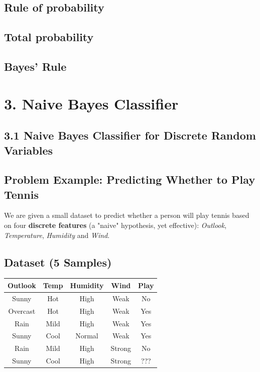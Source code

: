 \documentclass{article}
\begin{document}
\subsection*{Rule of probability}

\subsection*{Total probability}

\subsection*{Bayes' Rule}

\section*{3. Naive Bayes Classifier}

\subsection*{3.1 Naive Bayes Classifier for Discrete Random Variables}
\subsection*{Problem Example: Predicting Whether to Play Tennis}

We are given a small dataset to predict whether a person will play tennis based on four \textbf{discrete features} (a "naive" hypothesis, yet effective): \textit{Outlook}, \textit{Temperature}, \textit{Humidity} and \textit{Wind}.

\subsection*{Dataset (5 Samples)}

\begin{center}
\begin{tabular}{|c|c|c|c|c|}
\hline
Outlook & Temp & Humidity & Wind & Play \\
\hline
Sunny & Hot & High & Weak & No \\
Overcast & Hot & High & Weak & Yes \\
Rain & Mild & High & Weak & Yes \\
Sunny & Cool & Normal & Weak & Yes \\
Rain & Mild & High & Strong & No \\
Sunny & Cool & High & Strong & ??? \\
\hline
\end{tabular}
\end{center}
\end{document}
